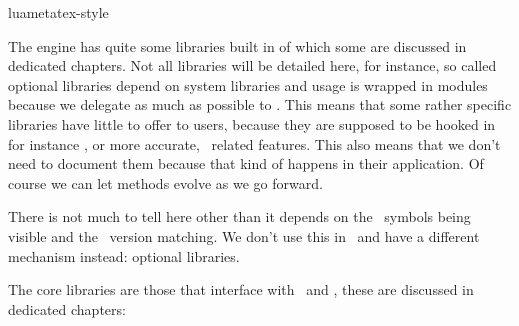 







\environment luametatex-style

\startdocument[title=Libraries]

\startsubject[title=Contents]
    \setups[sectioncontents]
\stopsubject

\startsection[title={Introduction}]

The engine has quite some libraries built in of which some are discussed in
dedicated chapters. Not all libraries will be detailed here, for instance, so
called optional libraries depend on system libraries and usage is wrapped in
modules because we delegate as much as possible to \LUA. This means that some
rather specific libraries have little to offer to users, because they are
supposed to be hooked in for instance \METAPOST, or more accurate, \LUAMETAFUN\
related features. This also means that we don't need to document them because
that kind of happens in their application. Of course we can let methods evolve
as we go forward.

\stopsection

\startsection[title={Third party}]

There is not much to tell here other than it depends on the \LUA\ symbols being
visible and the \LUA\ version matching. We don't use this in \CONTEXT\ and have a
different mechanism instead: optional libraries.

\stopsection

\startsection[title={Core}]

The core libraries are those that interface with \TEX\ and \METAPOST, these are
discussed in dedicated chapters:


